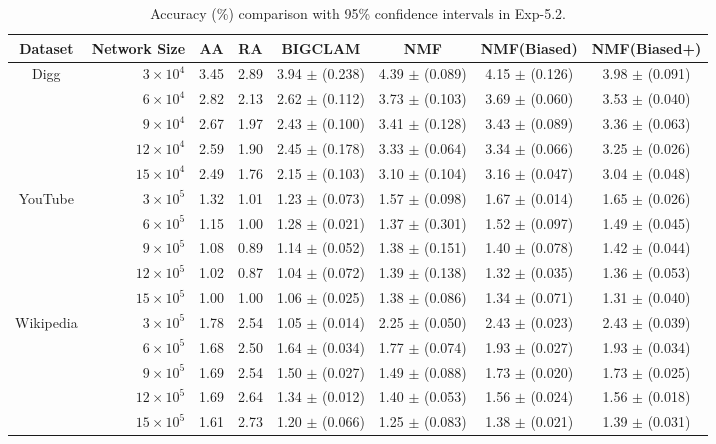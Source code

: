 \documentclass[10pt,journal,compsoc]{IEEEtran}
\newcommand{\NMF}{{\sf NMF}\xspace }
\newcommand{\Biased}{{\sf NMF(Biased)}\xspace}
\newcommand{\Aa}{{\sf AA}\xspace }
\newcommand{\RA}{{\sf RA}\xspace }
\newcommand{\BIGCLAM}{{\sf BIGCLAM}\xspace}
\newcommand{\Digg}{{\sf Digg}\xspace}
\newcommand{\YouTube}{{\sf YouTube}\xspace}
\newcommand{\Wikipedia}{{\sf Wikipedia}\xspace}
\newcommand{\Biasedp}{{\sf NMF(Biased+)}\xspace}
\begin{document}
\begin{table}
\caption{Accuracy (\%) comparison with 95\% confidence intervals in Exp-5.2.}
\label{tab_accuracy_8}
\vspace{-2ex}
\centering
\newcommand{\tabincell}[2]{\begin{tabular}{@{}#1@{}}#2\end{tabular}}
\begin{tabular}{c|r|c|c|c|c|c|c}
\hline \hline Dataset  & Network Size & \Aa & \RA & \BIGCLAM & \NMF & \Biased & \Biasedp  \\
\hline
\multirow{5}{*}{\Digg}
 & $3 \times 10^4 $  & 3.45 & 2.89 & 3.94 $\pm$ (0.238) & 4.39 $\pm$ (0.089) & 4.15 $\pm$ (0.126) & 3.98 $\pm$ (0.091) \\
 & $6 \times 10^4 $  & 2.82 & 2.13 & 2.62 $\pm$ (0.112) & 3.73 $\pm$ (0.103) & 3.69 $\pm$ (0.060) & 3.53 $\pm$ (0.040)  \\
 & $9 \times 10^4 $  & 2.67 & 1.97 & 2.43 $\pm$ (0.100) & 3.41 $\pm$ (0.128) & 3.43 $\pm$ (0.089) & 3.36 $\pm$ (0.063)  \\
 & $12 \times 10^4 $ & 2.59 & 1.90 & 2.45 $\pm$ (0.178) & 3.33 $\pm$ (0.064) & 3.34 $\pm$ (0.066) & 3.25 $\pm$ (0.026) \\
 & $15 \times 10^4 $ & 2.49 & 1.76 & 2.15 $\pm$ (0.103) & 3.10 $\pm$ (0.104) & 3.16 $\pm$ (0.047) & 3.04 $\pm$ (0.048)  \\
\hline
\multirow{5}{*}{\YouTube}
 & $3 \times 10^5 $  & 1.32 & 1.01 & 1.23 $\pm$ (0.073) & 1.57 $\pm$ (0.098) & 1.67 $\pm$ (0.014) & 1.65 $\pm$ (0.026)  \\
 & $6 \times 10^5 $  & 1.15 & 1.00 & 1.28 $\pm$ (0.021) & 1.37 $\pm$ (0.301) & 1.52 $\pm$ (0.097) & 1.49 $\pm$ (0.045)  \\
 & $9 \times 10^5 $  & 1.08 & 0.89 & 1.14 $\pm$ (0.052) & 1.38 $\pm$ (0.151) & 1.40 $\pm$ (0.078) & 1.42 $\pm$ (0.044)  \\
 & $12 \times 10^5 $ & 1.02 & 0.87 & 1.04 $\pm$ (0.072) & 1.39 $\pm$ (0.138) & 1.32 $\pm$ (0.035) & 1.36 $\pm$ (0.053)  \\
 & $15 \times 10^5 $ & 1.00 & 1.00 & 1.06 $\pm$ (0.025) & 1.38 $\pm$ (0.086) & 1.34 $\pm$ (0.071) & 1.31 $\pm$ (0.040)  \\
\hline
\multirow{5}{*}{\Wikipedia}
 & $3 \times 10^5 $  & 1.78 & 2.54 & 1.05 $\pm$ (0.014) & 2.25 $\pm$ (0.050) & 2.43 $\pm$ (0.023) & 2.43 $\pm$ (0.039)  \\
 & $6 \times 10^5 $  & 1.68 & 2.50 & 1.64 $\pm$ (0.034) & 1.77 $\pm$ (0.074) & 1.93 $\pm$ (0.027) & 1.93 $\pm$ (0.034)  \\
 & $9 \times 10^5 $  & 1.69 & 2.54 & 1.50 $\pm$ (0.027) & 1.49 $\pm$ (0.088) & 1.73 $\pm$ (0.020) & 1.73 $\pm$ (0.025)  \\
 & $12 \times 10^5 $ & 1.69 & 2.64 & 1.34 $\pm$ (0.012) & 1.40 $\pm$ (0.053) & 1.56 $\pm$ (0.024) & 1.56 $\pm$ (0.018)  \\
 & $15 \times 10^5 $ & 1.61 & 2.73 & 1.20 $\pm$ (0.066) & 1.25 $\pm$ (0.083) & 1.38 $\pm$ (0.021) & 1.39 $\pm$ (0.031) \\
\hline \hline
\end{tabular}
\vspace{-2ex}
\end{table}
\end{document}
